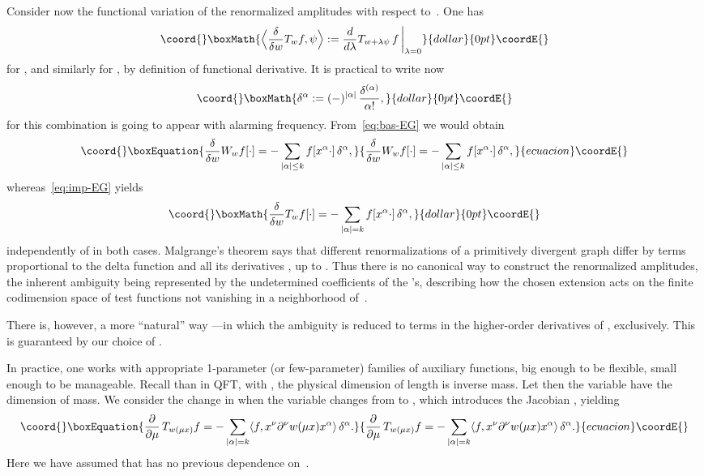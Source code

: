 \documentclass[a4paper,12pt]{article}
\renewcommand{\a}{\alpha}          %
\providecommand{\del}{\partial}        %
\providecommand{\dl}{\delta}           %
\providecommand{\la}{\lambda}          %
\providecommand{\7}{\dagger}           %
\def\<#1,#2>{\langle#1,#2\rangle}  %
\theoremstyle{plain}
\theoremstyle{definition}
\begin{document}
Consider now the functional variation of the renormalized amplitudes
with respect to~\coordHE{}. One has
$$\coord{}\boxMath{
\Bigl< \frac{\dl}{\dl w}T_w f, \psi \Bigr> :=
\frac{d}{d\la} T_{w+\la\psi}\,f\,\biggr|_{\la=0}
}{dollar}{0pt}\coordE{}$$
for \coordHE{}, and similarly for \coordHE{}, by definition of functional
derivative. It is practical to write now
$$\coord{}\boxMath{
\dl^\a := (-)^{|\a|}\,\frac{\dl^{(\a)}}{\a!},
}{dollar}{0pt}\coordE{}$$
for this combination is going to appear with alarming frequency.
{}From~\eqref{eq:bas-EG} we would obtain
\begin{equation}\coord{}\boxEquation{
\frac{\dl}{\dl w}W_w f[\cdot] =
- \sum_{|\a|\leq k} f[x^\a\cdot] \,\dl^\a,
\label{eq:funct-two}
}{
\frac{\dl}{\dl w}W_w f[\cdot] =
- \sum_{|\a|\leq k} f[x^\a\cdot] \,\dl^\a,
}{ecuacion}\coordE{}\end{equation}
whereas~\eqref{eq:imp-EG} yields
$$\coord{}\boxMath{
\frac{\dl}{\dl w}T_w f[\cdot] = - \sum_{|\a|=k} f[x^\a\cdot] \,\dl^\a,
}{dollar}{0pt}\coordE{}$$
independently of \coordHE{} in both cases. Malgrange's theorem says that
different renormalizations of a primitively divergent graph differ by
terms proportional to the delta function and all its derivatives
\myHighlight{$\delta^{(\a)}$}\coordHE{}, up to \myHighlight{$|\a| = k$}\coordHE{}. Thus there is no canonical way to
construct the renormalized amplitudes, the inherent ambiguity being
represented by the undetermined coefficients of the \myHighlight{$\delta$}\coordHE{}'s,
describing how the chosen extension acts on the finite codimension
space of test functions not vanishing in a neighborhood of~\coordHE{}.

There is, however, a more ``natural'' way ---in which the ambiguity is
reduced to terms in the higher-order derivatives of \myHighlight{$\delta$}\coordHE{},
exclusively. This is guaranteed by our choice of \coordHE{}.

In practice, one works with appropriate 1-parameter (or few-parameter)
families of auxiliary functions, big enough to be flexible, small
enough to be manageable. Recall than in QFT, with \coordHE{}, the
physical dimension of length is inverse mass. Let then the variable
\myHighlight{$\mu$}\coordHE{} have the dimension of mass. We consider the change in \coordHE{}
when the variable \coordHE{} changes from \coordHE{} to
\myHighlight{$w((\mu+\dl\mu) x)$}\coordHE{}, which introduces the Jacobian
\myHighlight{$\frac{\dl w}{\dl\mu} = \frac{\del w(\mu x)}{\del\mu}$}\coordHE{}, yielding
\begin{equation}\coord{}\boxEquation{
\frac{\del}{\del\mu}\,T_{w(\mu x)}f =
- \sum_{|\a|=k} \<f, x^\nu \del^\nu w(\mu x)x^\a> \,\dl^\a.
\label{eq:pre-ren}
}{
\frac{\del}{\del\mu}\,T_{w(\mu x)}f =
- \sum_{|\a|=k} \<f, x^\nu \del^\nu w(\mu x)x^\a> \,\dl^\a.
}{ecuacion}\coordE{}\end{equation}
Here we have assumed that \coordHE{} has no previous dependence on~\myHighlight{$\mu$}\coordHE{}.
\end{document}
